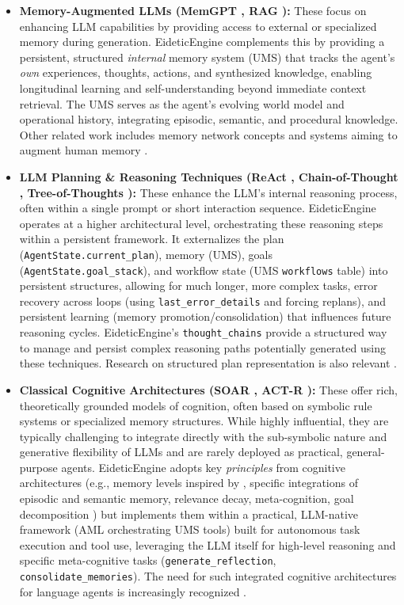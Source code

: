 \documentclass[12pt,a4paper]{article}
\newcommand{\code}[1]{\nolinkurl{#1}}
\begin{document}
\begin{itemize}
    \item \textbf{Memory-Augmented LLMs (MemGPT \cite{Ref12}, RAG \cite{Ref10}):} These focus on enhancing LLM capabilities by providing access to external or specialized memory during generation. EideticEngine complements this by providing a persistent, structured \textit{internal} memory system (UMS) that tracks the agent's \textit{own} experiences, thoughts, actions, and synthesized knowledge, enabling longitudinal learning and self-understanding beyond immediate context retrieval. The UMS serves as the agent's evolving world model and operational history, integrating episodic, semantic, and procedural knowledge. Other related work includes memory network concepts \cite{Ref23} and systems aiming to augment human memory \cite{Ref6}.

    \item \textbf{LLM Planning \& Reasoning Techniques (ReAct \cite{Ref25}, Chain-of-Thought \cite{Ref22}, Tree-of-Thoughts \cite{Ref24}):} These enhance the LLM's internal reasoning process, often within a single prompt or short interaction sequence. EideticEngine operates at a higher architectural level, orchestrating these reasoning steps within a persistent framework. It externalizes the plan (\code{AgentState.current\_plan}), memory (UMS), goals (\code{AgentState.goal\_stack}), and workflow state (UMS \code{workflows} table) into persistent structures, allowing for much longer, more complex tasks, error recovery across loops (using \code{last\_error\_details} and forcing replans), and persistent learning (memory promotion/consolidation) that influences future reasoning cycles. EideticEngine's \code{thought\_chains} provide a structured way to manage and persist complex reasoning paths potentially generated using these techniques. Research on structured plan representation is also relevant \cite{Ref8}.

    \item \textbf{Classical Cognitive Architectures (SOAR \cite{Ref9}, ACT-R \cite{Ref1, Ref2}):} These offer rich, theoretically grounded models of cognition, often based on symbolic rule systems or specialized memory structures. While highly influential, they are typically challenging to integrate directly with the sub-symbolic nature and generative flexibility of LLMs and are rarely deployed as practical, general-purpose agents. EideticEngine adopts key \textit{principles} from cognitive architectures (e.g., memory levels inspired by \cite{Ref3, Ref19}, specific integrations of episodic \cite{Ref11, Ref7} and semantic memory, relevance decay, meta-cognition, goal decomposition \cite{Ref9}) but implements them within a practical, LLM-native framework (AML orchestrating UMS tools) built for autonomous task execution and tool use, leveraging the LLM itself for high-level reasoning and specific meta-cognitive tasks (\code{generate\_reflection}, \code{consolidate\_memories}). The need for such integrated cognitive architectures for language agents is increasingly recognized \cite{Ref18}.


\end{itemize}
\end{document}
